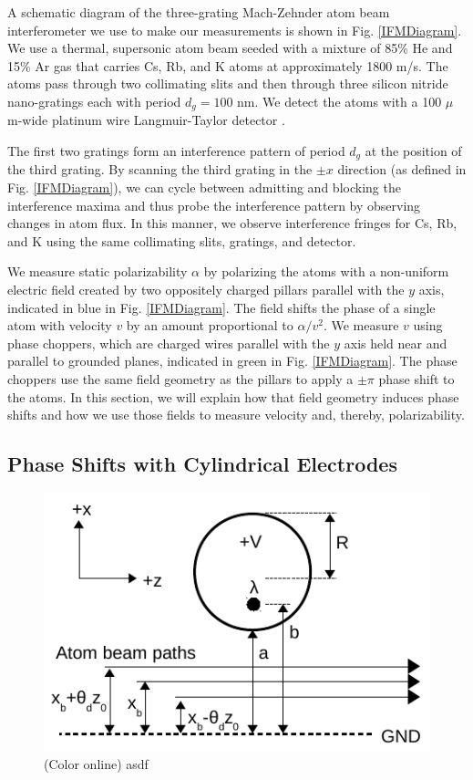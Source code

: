 \documentclass[twocolumn,prl,showpacs,superscriptaddress]{revtex4-1}   %
\newcommand{\figref}[1]{Fig. \ref{#1}}
\begin{document}
A schematic diagram of the three-grating Mach-Zehnder atom beam interferometer we use to make our measurements is shown in \figref{IFMDiagram}. We use a thermal, supersonic atom beam \cite{Scoles} seeded with a mixture of 85\% He and 15\% Ar gas that carries Cs, Rb, and K atoms at approximately 1800 m/s. 
The atoms pass through two collimating slits and then through three silicon nitride nano-gratings each with period $d_g = 100$ nm. We detect the atoms with a 100 $\mu$m-wide platinum wire Langmuir-Taylor detector \cite{Delhuille2002}.

The first two gratings form an interference pattern of period $d_g$ at the position of the third grating. By scanning the third grating in the $\pm x$ direction (as defined in \figref{IFMDiagram}), we can cycle between admitting and blocking the interference maxima and thus probe the interference pattern by observing changes in atom flux. In this manner, we observe interference fringes for Cs, Rb, and K using the same collimating slits, gratings, and detector.

We measure static polarizability $\alpha$ by polarizing the atoms with a non-uniform electric field created by two oppositely charged pillars parallel with the $y$ axis, indicated in blue in \figref{IFMDiagram}. The field shifts the phase of a single atom with velocity $v$ by an amount proportional to $\alpha/v^2$. We measure $v$ using phase choppers, which are charged wires parallel with the $y$ axis held near and parallel to grounded planes, indicated in green in \figref{IFMDiagram}. The phase choppers use the same field geometry as the pillars to apply a $\pm\pi$ phase shift to the atoms. In this section, we will explain how that field geometry induces phase shifts and how we use those fields to measure velocity and, thereby, polarizability. 

\subsection{Phase Shifts with Cylindrical Electrodes}
 
\begin{figure}
\includegraphics[width=\linewidth,keepaspectratio]{EDiagram1.pdf}
\caption{\label{EDiagram}(Color online) asdf}
\end{figure}
\end{document}
